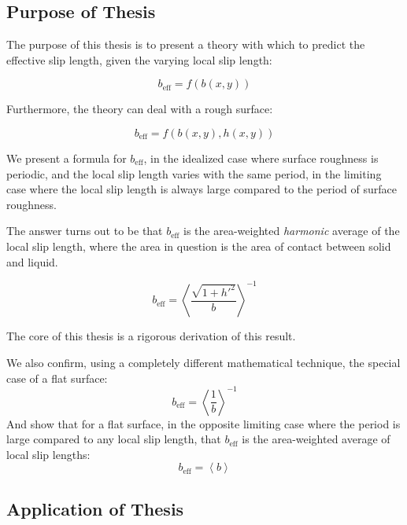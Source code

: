 \documentclass[12pt, a4paper, twoside, openright]{book}
\newcommand{\beff}{\ensuremath{b_{\mathrm{eff}}}}
\begin{document}
\clearpage

\subsection*{Purpose of Thesis}

The purpose of this thesis is to present a theory with which to predict the effective slip length, given the varying local slip length:

\begin{equation}
b_{\mathrm{eff}} = f(b(x,y))
\end{equation}

Furthermore, the theory can deal with a rough surface:

\begin{equation}
\beff = f(b(x,y),h(x,y))
\end{equation}

We present a formula for $\beff$, in the idealized case where surface roughness is periodic, and the local slip length varies with the same period, in the limiting case where the local slip length is always large compared to the period of surface roughness.

The answer turns out to be that $\beff$ is the area-weighted \emph{harmonic} average of the local slip length, where the area in question is the area of contact between solid and liquid.


\begin{equation}
\beff = \left< \frac{\sqrt{1+h'^{2}}}{b}  \right > ^{-1}
\end{equation}

The core of this thesis is a rigorous derivation of this result.

\vspace*{1em}
We also confirm, using a completely different mathematical technique, the special case of a flat surface:
\begin{equation}
\beff = \left< \frac{1}{b}  \right > ^{-1}
\end{equation}
And show that for a flat surface, in the opposite limiting case where the period is large compared to any local slip length, that $\beff$ is the area-weighted average of local slip lengths:
\begin{equation}
\beff = \left< b  \right >
\end{equation}


\subsection*{Application of Thesis}
\end{document}
